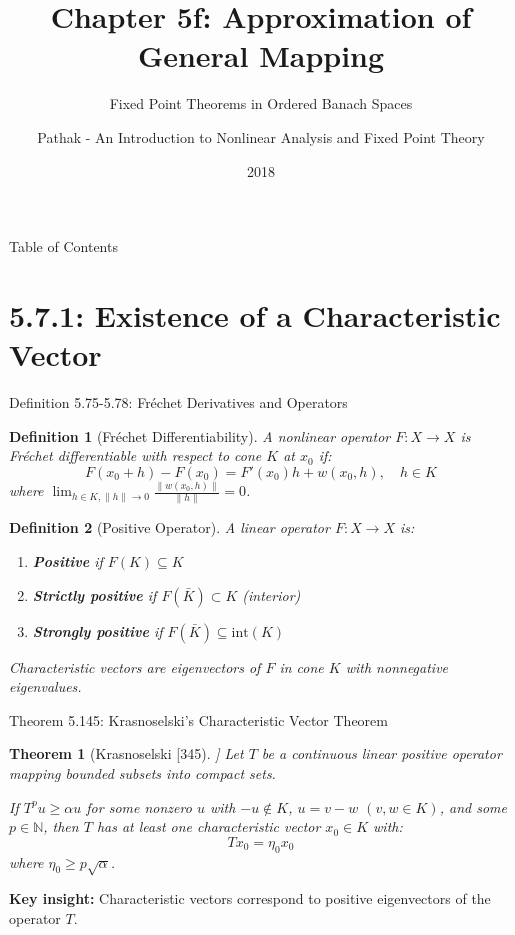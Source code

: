 \documentclass[aspectratio=169,10pt]{beamer}
\title{Chapter 5f: Approximation of General Mapping}
\subtitle{Fixed Point Theorems in Ordered Banach Spaces}
\author{Pathak - An Introduction to Nonlinear Analysis and Fixed Point Theory}
\date{2018}
\theoremstyle{plain}
\newtheorem*{theorem*}{Theorem}
\newtheorem*{definition*}{Definition}
\begin{document}
\begin{frame}
  \titlepage
\end{frame}

\begin{frame}{Table of Contents}
  \tableofcontents
\end{frame}

\section{5.7.1: Existence of a Characteristic Vector}

\begin{frame}{Definition 5.75-5.78: Fréchet Derivatives and Operators}
  \begin{definition*}[Fréchet Differentiability]
    A nonlinear operator $F : X \to X$ is Fréchet differentiable with respect to cone $K$ at $x_0$ if:
    $$F(x_0 + h) - F(x_0) = F'(x_0)h + w(x_0, h), \quad h \in K$$
    where $\lim_{h \in K, \|h\| \to 0} \frac{\|w(x_0, h)\|}{\|h\|} = 0$.
  \end{definition*}

  \vspace{1em}

  \begin{definition*}[Positive Operator]
    A linear operator $F : X \to X$ is:
    \begin{enumerate}
      \item \textbf{Positive} if $F(K) \subseteq K$
      \item \textbf{Strictly positive} if $F(\bar{K}) \subset K$ (interior)
      \item \textbf{Strongly positive} if $F(\bar{K}) \subseteq \text{int}(K)$
    \end{enumerate}
  \end{definition*}

  \vspace{0.5em}

  \textit{Characteristic vectors are eigenvectors of $F$ in cone $K$ with nonnegative eigenvalues.}
\end{frame}

\begin{frame}{Theorem 5.145: Krasnoselski's Characteristic Vector Theorem}
  \begin{theorem*}[Krasnoselski [345]]
    Let $T$ be a continuous linear positive operator mapping bounded subsets into compact sets.

    If $T^p u \geq \alpha u$ for some nonzero $u$ with $-u \notin K$, $u = v - w$ $(v,w \in K)$, and
    some $p \in \mathbb{N}$, then $T$ has at least one characteristic vector $x_0 \in K$ with:
    $$Tx_0 = \eta_0 x_0$$
    where $\eta_0 \geq p\sqrt{\alpha}$.
  \end{theorem*}

  \vspace{1em}

  \textbf{Key insight:} Characteristic vectors correspond to positive eigenvectors of the operator $T$.
\end{frame}
\end{document}
